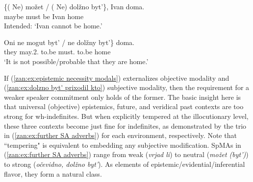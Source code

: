 \documentclass[output=paper,colorlinks,citecolor=brown]{langscibook}
\begin{document}
\ea 
{} 
        
\z
\z

\ea  
\ea \label{zan:ex:subjective modal-negation}
   \gll \{(\minsp{*} Ne) možet / (\minsp{*} Ne) dolžno byt'\}, Ivan doma.\\
       {} {\NEG} maybe {} {} {\NEG} must be Ivan home \\
\glt Intended: `Ivan cannot be home.'
 
\ex \gll Oni \minsp{\{} ne mogut byt' / ne dolžny byt'\} doma. \\
        they {} {\NEG} may.2.{\PL} to.be {} {\NEG} must.{\PL} to.be home\\
     \glt  `It is not possible/probable that they are home.' 
        
\z
\z

\noindent If (\ref{zan:ex:epistemic necessity modals}) externalizes objective modality and (\ref{zan:ex:dolzno byt' prixodil kto}) subjective modality, then the requirement for a weaker speaker commitment only holds of the former. The basic insight here is that universal (objective) epistemics, future, and veridical past contexts are too strong for wh-indefinites. But when explicitly tempered at the illocutionary level, these three contexts become just fine for indefinites, as demonstrated by the trio in (\ref{zan:ex:further SA adverbs}) for each environment, respectively. Note that ``tempering" is equivalent to embedding any subjective modification. SpMAs in (\ref{zan:ex:further SA adverbs}) range from weak (\textit{vrjad li}) to neutral (\textit{možet (byt')}) to strong (\textit{očevidno, dolžno byt'}). As elements of epistemic/evidential/inferential flavor, they form a natural class.         

\ea \label{zan:ex:further SA adverbs}
\end{document}
